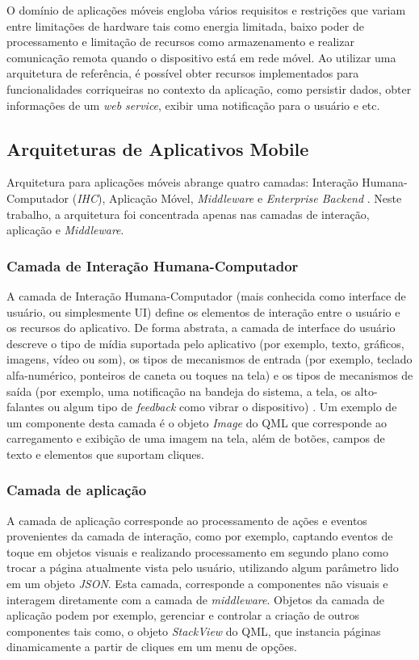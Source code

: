 O domínio de aplicações móveis engloba vários requisitos e restrições que variam entre limitações de hardware tais como energia limitada, baixo poder de processamento e limitação de recursos como armazenamento e realizar comunicação remota quando o dispositivo está em rede móvel. Ao utilizar uma arquitetura de referência, é possível obter recursos implementados para funcionalidades corriqueiras no contexto da aplicação, como persistir dados, obter informações de um \textit{web service}, exibir uma notificação para o usuário e etc.


\subsection{Arquiteturas de Aplicativos Mobile}
Arquitetura para aplicações móveis abrange quatro camadas: Interação Humana-Computador (\textit{IHC}), Aplicação Móvel, \textit{Middleware} e \textit{Enterprise Backend} \cite{Pabllo:2008:MMA:1621087.1621128}. Neste trabalho, a arquitetura foi concentrada apenas nas camadas de interação, aplicação e \textit{Middleware}.

\subsubsection{Camada de Interação Humana-Computador}
A camada de Interação Humana-Computador (mais conhecida como interface de usuário, ou simplesmente UI) define os elementos de interação entre o usuário e os recursos do aplicativo. De forma abstrata, a camada de interface do usuário descreve o tipo de mídia suportada pelo aplicativo (por exemplo, texto, gráficos, imagens, vídeo ou som), os tipos de mecanismos de entrada (por exemplo, teclado alfa-numérico, ponteiros de caneta ou toques na tela) e os tipos de mecanismos de saída (por exemplo, uma notificação na bandeja do sistema, a tela, os alto-falantes ou algum tipo de \textit{feedback} como vibrar o dispositivo) \cite{Pabllo:2008:MMA:1621087.1621128}. Um exemplo de um componente desta camada é o objeto \textit{Image} do QML que corresponde ao carregamento e exibição de uma imagem na tela, além de botões, campos de texto e elementos que suportam cliques.

\subsubsection{Camada de aplicação}
A camada de aplicação corresponde ao processamento de ações e eventos provenientes da camada de interação, como por exemplo, captando eventos de toque em objetos visuais e realizando processamento em segundo plano como trocar a página atualmente vista pelo usuário, utilizando algum parâmetro lido em um objeto \textit{JSON}. Esta camada, corresponde a componentes não visuais e interagem diretamente com a camada de \textit{middleware}. Objetos da camada de aplicação podem por exemplo, gerenciar e controlar a criação de outros componentes tais como, o objeto \textit{StackView} do QML, que instancia páginas dinamicamente a partir de cliques em um menu de opções.

